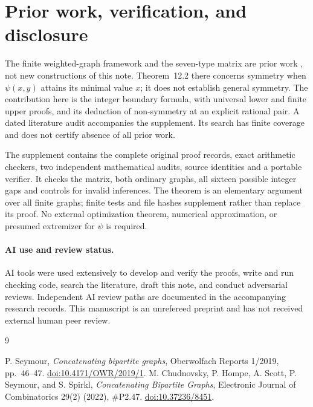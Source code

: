\documentclass[11pt]{article}
\begin{document}
\section{Prior work, verification, and disclosure}
The finite weighted-graph framework and the seven-type matrix
are prior work \cite{CHSSS}, not new constructions of this note.
Theorem~12.2 there concerns symmetry when $\psi(x,y)$ attains
its minimal value $x$; it does not establish general symmetry.
The contribution here is the integer boundary formula, with
universal lower and finite upper proofs, and its deduction of
non-symmetry at an explicit rational pair.
A dated literature audit accompanies the supplement. Its search
has finite coverage and does not certify absence of all prior work.

The supplement contains the complete original proof records,
exact arithmetic checkers, two independent mathematical audits,
source identities and a portable verifier. It checks the matrix,
both ordinary graphs, all sixteen possible integer gaps and
controls for invalid inferences. The theorem is an elementary
argument over all finite graphs; finite tests and file
hashes supplement rather than replace its proof. No external
optimization theorem, numerical approximation, or presumed
extremizer for $\psi$ is required.

\paragraph{AI use and review status.}
AI tools were used extensively to develop and verify the proofs,
write and run checking code, search the literature, draft this note,
and conduct adversarial reviews. Independent AI review paths
are documented in the accompanying research records.
This manuscript is an unrefereed preprint and has not received
external human peer review.

\begin{thebibliography}{9}
\raggedright
{}
P. Seymour, \emph{Concatenating bipartite graphs},
Oberwolfach Reports 1/2019, pp.~46--47.
\href{https://doi.org/10.4171/OWR/2019/1}{doi:10.4171/OWR/2019/1}.
M. Chudnovsky, P. Hompe, A. Scott, P. Seymour, and S. Spirkl,
\emph{Concatenating Bipartite Graphs},
Electronic Journal of Combinatorics 29(2) (2022), \#P2.47.
\href{https://doi.org/10.37236/8451}{doi:10.37236/8451}.
\end{thebibliography}
\end{document}
